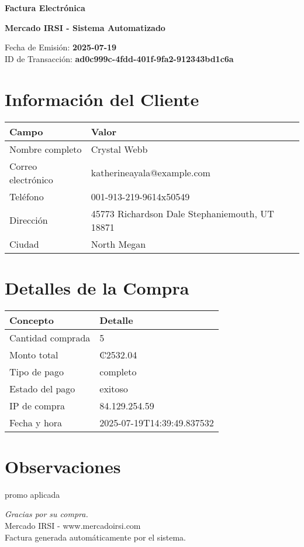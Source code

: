 \documentclass[12pt]{article}
\begin{document}
\begin{center}
    \Huge \textbf{Factura Electrónica}

    \vspace{0.3cm}
    \large \textbf{Mercado IRSI - Sistema Automatizado}

    \vspace{0.5cm}
    \normalsize Fecha de Emisión: \textbf{2025-07-19} \\
    ID de Transacción: \textbf{ad0c999c-4fdd-401f-9fa2-912343bd1c6a} \\
\end{center}

\vspace{1cm}

\section*{Información del Cliente}
\begin{tabularx}{\textwidth}{L{4cm} L{12cm}}
\textbf{Campo} & \textbf{Valor} \\
\hline
Nombre completo & Crystal Webb \\
Correo electrónico & katherineayala@example.com \\
Teléfono & 001-913-219-9614x50549 \\
Dirección & 45773 Richardson Dale Stephaniemouth, UT 18871 \\
Ciudad & North Megan \\
\end{tabularx}

\vspace{0.8cm}

\section*{Detalles de la Compra}
\begin{tabularx}{\textwidth}{L{6cm} L{10cm}}
\textbf{Concepto} & \textbf{Detalle} \\
\hline
Cantidad comprada & 5 \\
Monto total & ₡2532.04 \\
Tipo de pago & completo \\
Estado del pago & exitoso \\
IP de compra & 84.129.254.59 \\
Fecha y hora & 2025-07-19T14:39:49.837532 \\
\end{tabularx}

\vspace{1.5cm}

\section*{Observaciones}
promo aplicada

\vfill

\begin{center}
    \textit{Gracias por su compra.} \\
    Mercado IRSI - www.mercadoirsi.com \\
    Factura generada automáticamente por el sistema.
\end{center}
\end{document}
